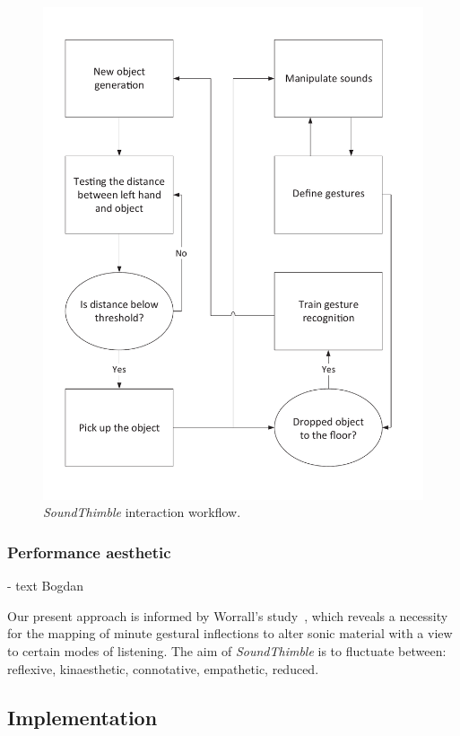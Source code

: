 \documentclass{nime-alternate}
\begin{document}
\begin{figure}[t]
	\centering
	\includegraphics[width=.75\columnwidth]{img/concept}
	\caption{\textit{SoundThimble} interaction workflow.}
	\label{fig:concept}
\end{figure}

\subsubsection{Performance aesthetic}

- text Bogdan

Our present approach is informed by Worrall's study~\cite{worrall2013understanding}, which reveals a necessity for the mapping of minute gestural inflections to alter sonic material with a view to certain modes of listening. The aim of \textit{SoundThimble} is to fluctuate between: reflexive, kinaesthetic, connotative, empathetic, reduced.

\subsection{Implementation}

\end{document}
